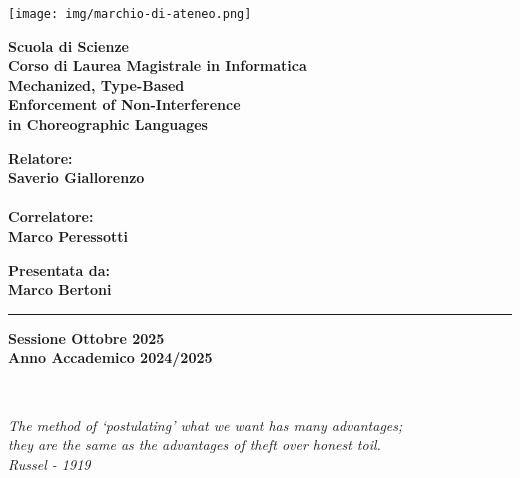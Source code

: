 \documentclass[12pt,a4paper,twoside]{book}
\begin{document}
\pagestyle{empty}

\begin{titlepage}
\begin{center}

\texttt{[image: img/marchio-di-ateneo.png]}

\vspace{10mm}
{\large{\bf{Scuola di Scienze}}}\\
\vspace{5mm}
{\Large{\bf{Corso di Laurea Magistrale in Informatica}}}\\
\vspace{15mm}
{\Huge{\bf Mechanized, Type-Based}}\\
\vspace{1mm}
{\Huge{\bf Enforcement of Non-Interference}}\\
\vspace{2mm}
{\Huge{\bf in Choreographic Languages}}\\
\end{center}
\vspace{35mm}
\begin{minipage}[t]{0.40\textwidth}
{\Large{\bf Relatore: \\ Saverio Giallorenzo}}\\
\vspace{3mm}\\
{\Large{\bf Correlatore: \\ Marco Peressotti}}
\end{minipage}
\hfill
\begin{minipage}[t]{0.40\textwidth}\raggedleft
{\Large{\bf Presentata da: \\ Marco Bertoni}}
\end{minipage}

\vspace{35mm}
\rule[0.5cm]{15.8cm}{0.6mm}
\begin{center}
{\large{\bf Sessione Ottobre 2025\\}}
{\large{\bf Anno Accademico 2024/2025\\}}
\end{center}
\end{titlepage}
\restoregeometry

\newpage~\newpage

\topmargin=6.5cm
\begin{flushright}
\emph{
\large{The method of `postulating' what we want has many advantages; }\\\vspace{1mm}
\large{they are the same as the advantages of theft over honest toil.}\\\vspace{3mm} 
\large{Russel - 1919} 
}
\end{flushright}
\end{document}
